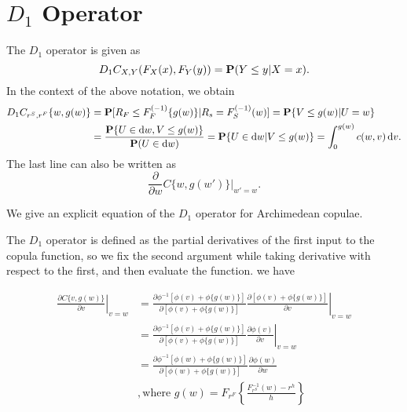 
\section{$D_1$ Operator}


The $D_1$ operator is given as
\begin{equation*}
    D_1 C_{X,Y}(F_X(x), F_Y(y)) = {\bf P}(Y\leq y|X=x).
\end{equation*}
In the context of the above notation, we obtain
\begin{align*}
  D_1 C_{r^S, r^F}\{w, g(w)\} &= \p[R_F\leq F_{F}^{(-1)}\{g(w)\}|
  R_s=F_S^{(-1)}(w)] %
  = \p\{V\leq g(w)| U=w\}\\ %
  &= \frac{\p\{U\in \dd w, V\leq g(w)\}} {\p(U\in \dd w)} %
  = \p\{U\in \dd w| V\leq g(w)\} %
  = \int_0^{g(w)} c(w,v)\, \dd v. 
\end{align*}
The last line can also be written as 
\begin{equation*}
  \frac{\partial }{\partial w} C\{w, g(w')\} \big|_{w'=w}.
\end{equation*}



We give an explicit equation of the $D_1$ operator for Archimedean copulae.

The $D_1$ operator is defined as the partial derivatives of the first input to the copula function,
so we fix the second argument while taking derivative with respect to the first, and then evaluate the function.
we have

\begin{align}
\left.\frac{\partial C\{v, g(w)\}}{\partial v} \right\vert_{v=w}
&=
\left.\frac{\partial  \phi^{-1}[\phi(v)+\phi\{g(w)\}]}
{\partial  [\phi(v)+\phi\{g(w)\}]}
\frac{\partial  [\phi(v)+\phi\{g(w)\}]}
{\partial  v}
\right\vert_{v=w}\\
&=
\left.\frac{\partial   \phi^{-1}[\phi(v)+\phi\{g(w)\}]}
{\partial [\phi(v)+\phi\{g(w)\}]}
\frac{\partial  \phi(v)}{\partial  v}
\right\vert_{v=w}\\
&=
\frac{\partial \phi^{-1}[\phi(w)+\phi\{g(w)\}]}
{\partial [\phi(w)+\phi\{g(w)\}]}
\frac{\partial  \phi(w)}{\partial  w}\\
&,
\text{where } g(w) = F_{r^F}\left\{\frac{F^{-1}_{r^S}(w)-r^h}{h}\right\}\\
\end{align}

